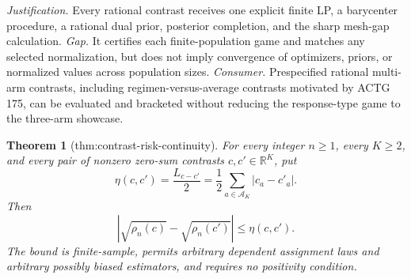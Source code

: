 \documentclass{article}
\newtheorem{theorem}{Theorem}
\begin{document}
\par\smallskip\noindent \textit{Justification.} Every rational contrast receives one explicit finite LP, a barycenter procedure, a rational dual prior, posterior completion, and the sharp mesh-gap calculation. \textit{Gap.} It certifies each finite-population game and matches any selected normalization, but does not imply convergence of optimizers, priors, or normalized values across population sizes. \textit{Consumer.} Prespecified rational multi-arm contrasts, including regimen-versus-average contrasts motivated by ACTG 175, can be evaluated and bracketed without reducing the response-type game to the three-arm showcase.

\begin{theorem}[thm:contrast-risk-continuity]\label{thm:contrast-risk-continuity}
For every integer \(n\geq1\), every \(K\geq2\), and every pair of nonzero zero-sum contrasts \(c,c'\in\mathbb R^K\), put
\[
 \eta(c,c')=\frac{L_{c-c'}}2
 =\frac12\sum_{a\in\mathcal A_K}|c_a-c'_a|.
\]
Then
\[
 \left|\sqrt{\rho_n(c)}-\sqrt{\rho_n(c')}\right|
 \leq \eta(c,c').
\]
The bound is finite-sample, permits arbitrary dependent assignment laws and arbitrary possibly biased estimators, and requires no positivity condition.
\end{theorem}
\end{document}
